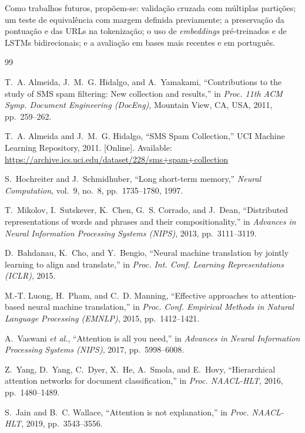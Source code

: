 \documentclass[conference]{IEEEtran}
\begin{document}
Como trabalhos futuros, propõem-se: validação cruzada com múltiplas partições; um teste de equivalência com margem definida previamente; a preservação da pontuação e das URLs na tokenização; o uso de \textit{embeddings} pré-treinados e de LSTMs bidirecionais; e a avaliação em bases mais recentes e em português.

\begin{thebibliography}{99}

T.~A. Almeida, J.~M.~G. Hidalgo, and A.~Yamakami, ``Contributions to the study of SMS spam filtering: New collection and results,'' in \textit{Proc. 11th ACM Symp. Document Engineering (DocEng)}, Mountain View, CA, USA, 2011, pp.~259--262.

T.~A. Almeida and J.~M.~G. Hidalgo, ``SMS Spam Collection,'' UCI Machine Learning Repository, 2011. [Online]. Available: \url{https://archive.ics.uci.edu/dataset/228/sms+spam+collection}

S.~Hochreiter and J.~Schmidhuber, ``Long short-term memory,'' \textit{Neural Computation}, vol.~9, no.~8, pp.~1735--1780, 1997.

T.~Mikolov, I.~Sutskever, K.~Chen, G.~S. Corrado, and J.~Dean, ``Distributed representations of words and phrases and their compositionality,'' in \textit{Advances in Neural Information Processing Systems (NIPS)}, 2013, pp.~3111--3119.

D.~Bahdanau, K.~Cho, and Y.~Bengio, ``Neural machine translation by jointly learning to align and translate,'' in \textit{Proc. Int. Conf. Learning Representations (ICLR)}, 2015.

M.-T. Luong, H.~Pham, and C.~D. Manning, ``Effective approaches to attention-based neural machine translation,'' in \textit{Proc. Conf. Empirical Methods in Natural Language Processing (EMNLP)}, 2015, pp.~1412--1421.

A.~Vaswani \textit{et al.}, ``Attention is all you need,'' in \textit{Advances in Neural Information Processing Systems (NIPS)}, 2017, pp.~5998--6008.

Z.~Yang, D.~Yang, C.~Dyer, X.~He, A.~Smola, and E.~Hovy, ``Hierarchical attention networks for document classification,'' in \textit{Proc. NAACL-HLT}, 2016, pp.~1480--1489.

S.~Jain and B.~C. Wallace, ``Attention is not explanation,'' in \textit{Proc. NAACL-HLT}, 2019, pp.~3543--3556.


\end{thebibliography}
\end{document}
